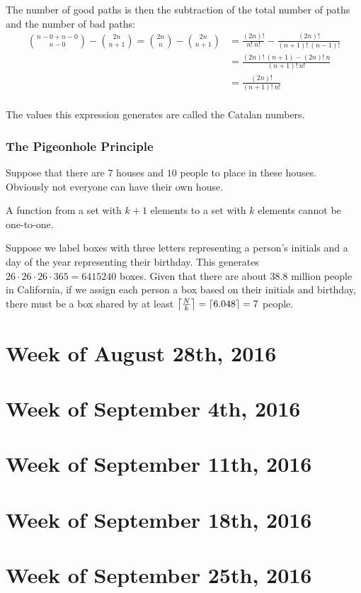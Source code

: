 \documentclass{article}
\begin{document}
\noindent The number of good paths is then the subtraction of the total number of paths and the number of bad paths:
\begin{align*}
\binom{n-0+n-0}{n-0}-\binom{2n}{n+1}=\binom{2n}{n}-\binom{2n}{n+1}&=\frac{(2n)!}{n!\ n!}-\frac{(2n)!}{(n+1)!\ (n-1)!} \\
		&=\frac{(2n)!\ (n+1)-(2n)!\ n}{(n+1)!\ n!} \\
		&=\frac{(2n)!}{(n+1)!\ n!} \\
\end{align*}

\noindent The values this expression generates are called the Catalan numbers.

\subsubsection{The Pigeonhole Principle}
Suppose that there are $7$ houses and $10$ people to place in these houses. Obviously not everyone can have their own house.
\begin{corl}
A function from a set with $k+1$ elements to a set with $k$ elements cannot be one-to-one.
\end{corl}
\begin{example}
Suppose we label boxes with three letters representing a person's initials and a day of the year representing their birthday. This generates $26\cdot 26\cdot 26\cdot 365=6415240$ boxes. Given that there are about $38.8$ million people in California, if we assign each person a box based on their initials and birthday, there must be a box shared by at least $\left\lceil\frac{N}{k}\right\rceil=\left\lceil6.048\right\rceil=7$ people.
\end{example}
\section{Week of August 28th, 2016}
\section{Week of September 4th, 2016}
\section{Week of September 11th, 2016}
\section{Week of September 18th, 2016}
\section{Week of September 25th, 2016}
\end{document}
